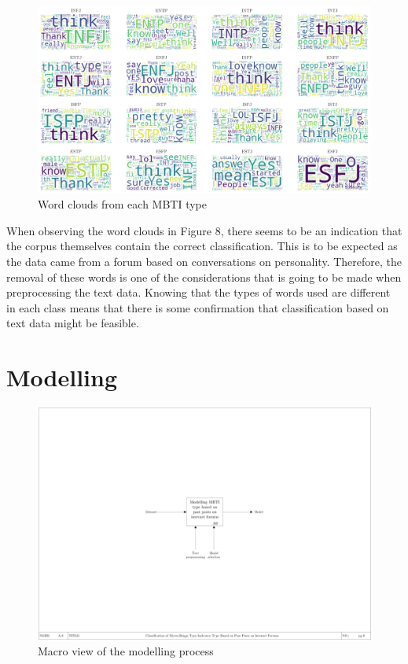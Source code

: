 \documentclass[11pt,a4paper]{article}
\begin{document}
	\begin{figure}[h!]
		\centering
		
		\includegraphics[width=\textwidth]{../output/visualisations/wc}
		
		\caption{Word clouds from each MBTI type}
		
	\end{figure}

	When observing the word clouds in Figure 8, there seems to be an indication that the corpus themselves contain the correct classification. This is to be expected as the data came from a forum based on conversations on personality. Therefore, the removal of these words is one of the considerations that is going to be made when preprocessing the text data. Knowing that the types of words used are different in each class means that there is some confirmation that classification based on text data might be feasible.
	
	\newpage
	\section{Modelling}
	
	\begin{figure}[h!]
		\centering
		
		\includegraphics[width=\textwidth]{img/CDS0}
		
		\caption{Macro view of the modelling process}
		
	\end{figure}
\end{document}
